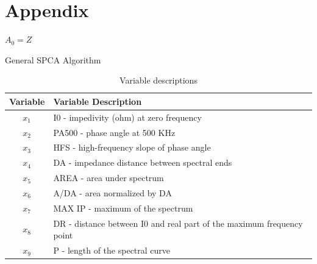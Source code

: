 \documentclass[11pt,letterpaper]{report}
\begin{document}

\pagebreak



\pagebreak
\appendix
\section*{Appendix}

\begin{algorithm}[H]
\SetAlgoLined
{}
$A_0 = Z$\;
\caption{General SPCA Algorithm}
\label{algo1:SPCA}
\end{algorithm}

\begin{table}[htpb!]
\caption{Variable descriptions}
\label{tab1:dta_vars}
\begin{center}
 \begin{tabular}{||c l||}
 \hline
Variable & Variable Description \\ [0.5ex] 
 \hline\hline
 $x_{1}$ & I0 - impedivity (ohm) at zero frequency \\ 
 \hline
 $x_{2}$ & 	PA500 - phase angle at 500 KHz \\
 \hline
 $x_{3}$ & HFS - high-frequency slope of phase angle \\
 \hline
 $x_{4}$ & DA - impedance distance between spectral ends \\
 \hline
 $x_{5}$ & AREA - area under spectrum \\
 \hline
 $x_{6}$ & 	A/DA - area normalized by DA \\
 \hline
 $x_{7}$ & MAX IP - maximum of the spectrum \\
 \hline
 $x_{8}$ & 	DR - distance between I0 and real part of the maximum frequency point \\
 \hline
 $x_{9}$ & P - length of the spectral curve \\ [1ex] 
 \hline
\end{tabular}
\end{center}
\end{table}
\end{document}
